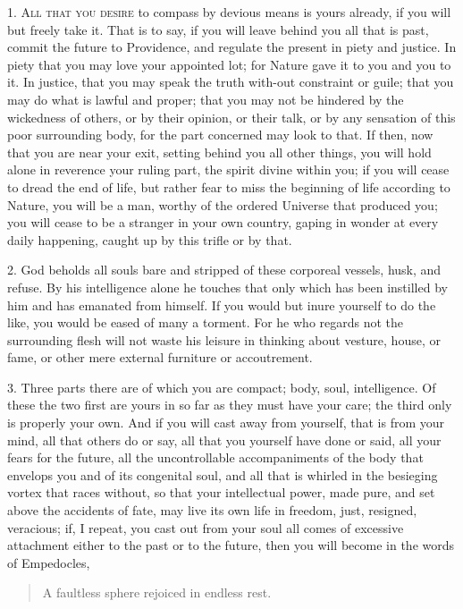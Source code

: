 \documentclass{book}
\begin{document}
1. \textsc{All that you desire} to compass by devious means is yours already,
if you will but freely take it. That is to say, if you will leave
behind you all that is past, commit the future to Providence, and
regulate the present in piety and justice. In piety that you may love
your appointed lot; for Nature gave it to you and you to it. In
justice, that you may speak the truth with-out constraint or guile;
that you may do what is lawful and proper; that you may not be
hindered by the wickedness of others, or by their opinion, or their
talk, or by any sensation of this poor surrounding body, for the part
concerned may look to that. If then, now that you are near your exit,
setting behind you all other things, you will hold alone in reverence
your ruling part, the spirit divine within you; if you will cease to
dread the end of life, but rather fear to miss the beginning of life
according to Nature, you will be a man, worthy of the ordered Universe
that produced you; you will cease to be a stranger in your own
country, gaping in wonder at every daily happening, caught up by this
trifle or by that.

2. God beholds all souls bare and stripped of these corporeal vessels,
husk, and refuse. By his intelligence alone he touches that only which
has been instilled by him and has emanated from himself. If you would
but inure yourself to do the like, you would be eased of many a
torment. For he who regards not the surrounding flesh will not waste
his leisure in thinking about vesture, house, or fame, or other mere
external furniture or accoutrement.

3. Three parts there are of which you are compact; body, soul,
intelligence. Of these the two first are yours in so far as they must
have your care; the third only is properly your own. And if you will
cast away from yourself, that is from your mind, all that others do or
say, all that you yourself have done or said, all your fears for the
future, all the uncontrollable accompaniments of the body that
envelops you and of its congenital soul, and all that is whirled in
the besieging vortex that races without, so that your intellectual
power, made pure, and set above the accidents of fate, may live its
own life in freedom, just, resigned, veracious; if, I repeat, you cast
out from your soul all comes of excessive attachment either to the
past or to the future, then you will become in the words of
Empedocles,

\begin{quote}
    A faultless sphere rejoiced in endless rest.
\end{quote}
\end{document}
